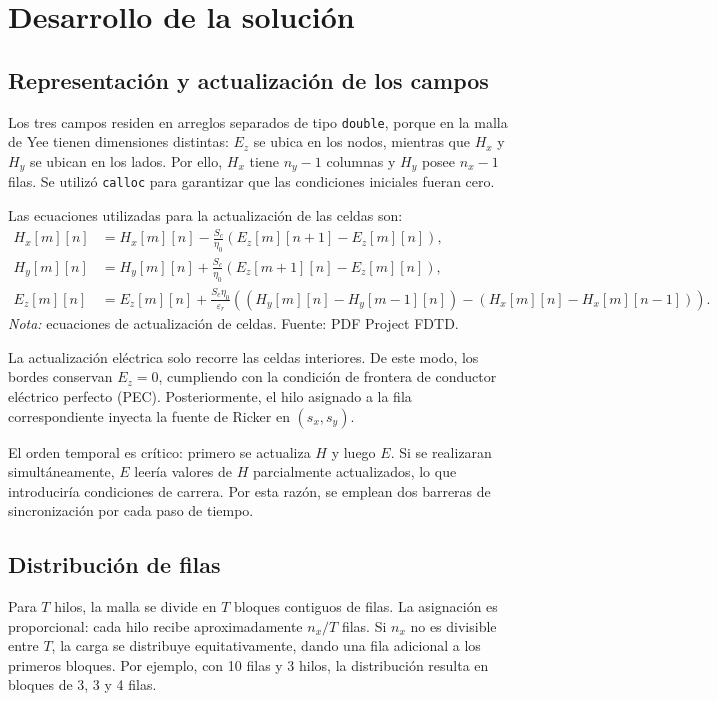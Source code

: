 \documentclass[12pt,a4paper]{article}
\begin{document}
\section{Desarrollo de la solución}
\subsection{Representación y actualización de los campos}
Los tres campos residen en arreglos separados de tipo \texttt{double}, porque en la malla de Yee tienen dimensiones distintas: $E_z$ se ubica en los nodos, mientras que $H_x$ y $H_y$ se ubican en los lados. Por ello, $H_x$ tiene $n_y-1$ columnas y $H_y$ posee $n_x-1$ filas. Se utilizó \texttt{calloc} para garantizar que las condiciones iniciales fueran cero.

Las ecuaciones utilizadas para la actualización de las celdas son:
\begin{align*}
H_x[m][n] &= H_x[m][n] - \frac{S_c}{\eta_0}\left(E_z[m][n+1]-E_z[m][n]\right),\\[0.4em]
H_y[m][n] &= H_y[m][n] + \frac{S_c}{\eta_0}\left(E_z[m+1][n]-E_z[m][n]\right),\\[0.4em]
E_z[m][n] &= E_z[m][n] + \frac{S_c\eta_0}{\varepsilon_r}
\left((H_y[m][n]-H_y[m-1][n])-(H_x[m][n]-H_x[m][n-1])\right).
\end{align*}
\textit{Nota:} ecuaciones de actualización de celdas. Fuente: PDF Project FDTD.

La actualización eléctrica solo recorre las celdas interiores. De este modo, los bordes conservan $E_z=0$, cumpliendo con la condición de frontera de conductor eléctrico perfecto (PEC). Posteriormente, el hilo asignado a la fila correspondiente inyecta la fuente de Ricker en $(s_x,s_y)$.

El orden temporal es crítico: primero se actualiza $H$ y luego $E$. Si se realizaran simultáneamente, $E$ leería valores de $H$ parcialmente actualizados, lo que introduciría condiciones de carrera. Por esta razón, se emplean dos barreras de sincronización por cada paso de tiempo.

\subsection{Distribución de filas}
Para $T$ hilos, la malla se divide en $T$ bloques contiguos de filas. La asignación es proporcional: cada hilo recibe aproximadamente $n_x/T$ filas. Si $n_x$ no es divisible entre $T$, la carga se distribuye equitativamente, dando una fila adicional a los primeros bloques. Por ejemplo, con 10 filas y 3 hilos, la distribución resulta en bloques de 3, 3 y 4 filas.
\end{document}
